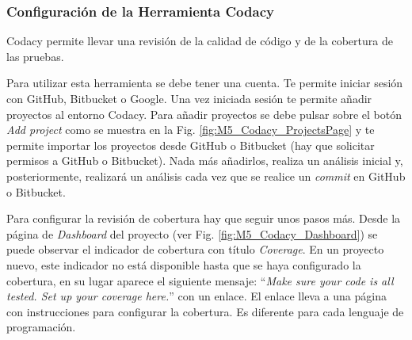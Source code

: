 \subsubsection{Configuración de la Herramienta Codacy}

Codacy permite llevar una revisión de la calidad de código y de la cobertura de las pruebas.

Para utilizar esta herramienta se debe tener una cuenta. Te permite iniciar sesión con GitHub, Bitbucket o Google. Una vez iniciada sesión te permite añadir proyectos al entorno Codacy. Para añadir proyectos se debe pulsar sobre el botón \textit{Add project} como se muestra en la Fig. \ref{fig:M5_Codacy_ProjectsPage} y te permite importar los proyectos desde GitHub o Bitbucket (hay que solicitar permisos a GitHub o Bitbucket). Nada más añadirlos, realiza un análisis inicial y, posteriormente, realizará un análisis cada vez que se realice un \textit{commit} en GitHub o Bitbucket.


Para configurar la revisión de cobertura hay que seguir unos pasos más. Desde la página de \textit{Dashboard} del proyecto (ver Fig. \ref{fig:M5_Codacy_Dashboard}) se puede observar el indicador de cobertura con título \textit{Coverage}. En un proyecto nuevo, este indicador no está disponible hasta que se haya configurado la cobertura, en su lugar aparece el siguiente mensaje: ``\textit{Make sure your code is all tested. Set up your coverage here.}'' con un enlace. El enlace lleva a una página con instrucciones para configurar la cobertura. Es diferente para cada lenguaje de programación.


